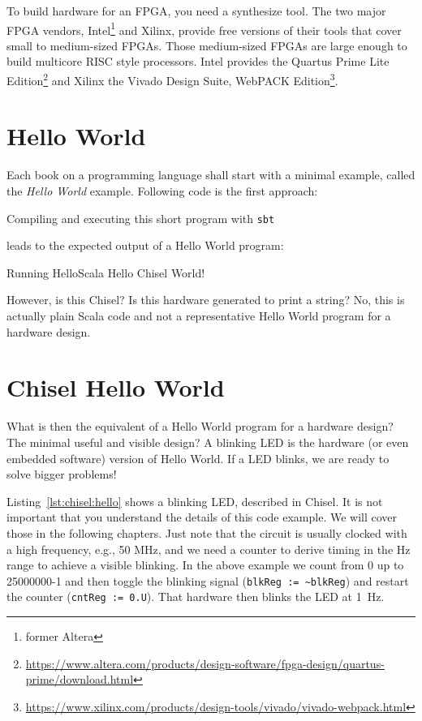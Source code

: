 \documentclass[%
    10pt,
    headinclude, footexclude,
    openright, %
    notitlepage,
    cleardoubleempty,
    headsepline,
    pointlessnumbers,
    bibtotoc, idxtotoc,
    ]{scrbook}
\newcommand{\code}[1]{{\small{\texttt{#1}}}}
\newcommand{\myref}[2]{\href{#1}{#2}}
\renewcommand{\myref}[2]{{#2}{\footnote{\url{#1}}}}
\begin{document}
To build hardware for an FPGA, you need a synthesize tool. The two major
FPGA vendors, Intel\footnote{former Altera} and Xilinx, provide free versions of
their tools that cover small to medium-sized FPGAs. Those medium-sized
FPGAs are large enough to build multicore RISC style processors.
Intel provides the \myref{https://www.altera.com/products/design-software/fpga-design/quartus-prime/download.html}{Quartus Prime Lite Edition} and Xilinx the
\myref{https://www.xilinx.com/products/design-tools/vivado/vivado-webpack.html}{Vivado Design Suite, WebPACK Edition}.

\section{Hello World}

Each book on a programming language shall start with a minimal example,
called the \emph{Hello World} example. Following code is the first approach:




\noindent Compiling and executing this short program with \code{sbt}


\noindent leads to the expected output of a Hello World program:

\begin{chisel}
[info] Running HelloScala
Hello Chisel World!
\end{chisel}

\noindent However, is this Chisel? Is this hardware generated to print a string?
No, this is actually plain Scala code and not a representative Hello World
program for a hardware design.

\section{Chisel Hello World}

What is then the equivalent of a Hello World program for a hardware design?
The minimal useful and visible design? A blinking LED is the hardware (or even
embedded software) version of Hello World. If a LED blinks, we are ready to
solve bigger problems!


Listing~\ref{lst:chisel:hello} shows a blinking LED, described in Chisel.
It is not important that you understand the details of this code example.
We will cover those in the following chapters. Just note that the circuit is
usually clocked with a high frequency, e.g., 50 MHz, and we need a counter
to derive timing in the Hz range to achieve a visible blinking. In the above
example we count from 0 up to 25000000-1 and then toggle the blinking signal
(\code{blkReg := \textasciitilde blkReg}) and restart the counter (\code{cntReg := 0.U}).
That hardware then blinks the LED at 1~Hz.
\end{document}
